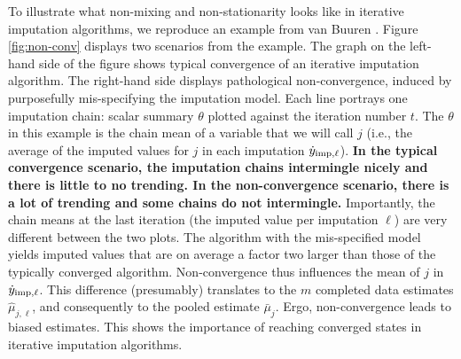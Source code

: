 \documentclass[Royal,times,sageh]{sagej}
\begin{document}
To illustrate what non-mixing and non-stationarity looks like in iterative imputation algorithms, we reproduce an example from van Buuren \citeyearpar[\(\S\) 6.5.2]{buur18}. Figure \ref{fig:non-conv} displays two scenarios from the example. The graph on the left-hand side of the figure shows typical convergence of an iterative imputation algorithm. The right-hand side displays pathological non-convergence, induced by purposefully mis-specifying the imputation model. Each line portrays one imputation chain: scalar summary \(\theta\) plotted against the iteration number \(t\). The \(\theta\) in this example is the chain mean of a variable that we will call \(j\) (i.e., the average of the imputed values for \(j\) in each imputation \(\dot y_{\rm imp, \ell}\)). \textbf{In the typical convergence scenario, the imputation chains intermingle nicely and there is little to no trending. In the non-convergence scenario, there is a lot of trending and some chains do not intermingle.} Importantly, the chain means at the last iteration (the imputed value per imputation \(\ell\)) are very different between the two plots. The algorithm with the mis-specified model yields imputed values that are on average a factor two larger than those of the typically converged algorithm. Non-convergence thus influences the mean of \(j\) in \(\dot y_{\rm imp, \ell}\). This difference (presumably) translates to the \(m\) completed data estimates \(\hat{\mu}_{j,\ell}\), and consequently to the pooled estimate \(\bar{\mu}_j\). Ergo, non-convergence leads to biased estimates. This shows the importance of reaching converged states in iterative imputation algorithms.
\end{document}

